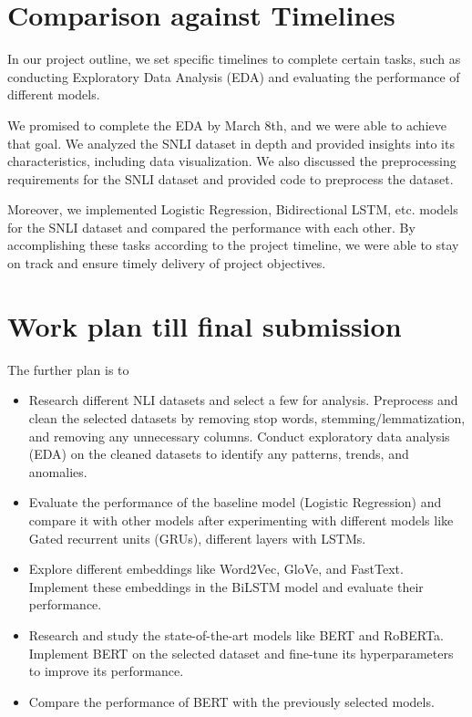 \section{Comparison against Timelines}

In our project outline, we set specific timelines to complete certain tasks, such as conducting Exploratory Data Analysis (EDA) and evaluating the performance of different models.

We promised to complete the EDA by March 8th, and we were able to achieve that goal. We analyzed the SNLI dataset in depth and provided insights into its characteristics, including data visualization. We also discussed the preprocessing requirements for the SNLI dataset and provided code to preprocess the dataset.

Moreover, we implemented Logistic Regression, Bidirectional LSTM, etc. models for the SNLI dataset and compared the performance with each other. By accomplishing these tasks according to the project timeline, we were able to stay on track and ensure timely delivery of project objectives.


\section{Work plan till final submission}

The further plan is to

\begin{itemize}
	\item Research different NLI datasets and select a few for analysis. Preprocess and clean the selected datasets by removing stop words, stemming/lemmatization, and removing any unnecessary columns. Conduct exploratory data analysis (EDA) on the cleaned datasets to identify any patterns, trends, and anomalies.
	\item Evaluate the performance of the baseline model (Logistic Regression) and compare it with other models after experimenting with different models like Gated recurrent units (GRUs), different layers with LSTMs.
	\item Explore different embeddings like Word2Vec, GloVe, and FastText. Implement these embeddings in the BiLSTM model and evaluate their performance.
	\item Research and study the state-of-the-art models like BERT and RoBERTa. Implement BERT on the selected dataset and fine-tune its hyperparameters to improve its performance.
	\item Compare the performance of BERT with the previously selected models.
\end{itemize}
